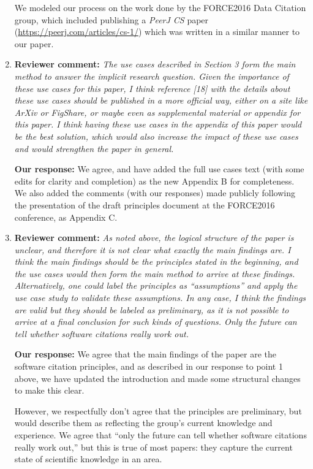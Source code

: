 \documentclass{article}
\begin{document}
\begin{enumerate}
We modeled our process on the work done by the FORCE2016 Data Citation group, which included publishing a \emph{PeerJ CS} paper (\url{https://peerj.com/articles/cs-1/}) which was written in a similar manner to our paper.

\item \textbf{Reviewer comment:}
\emph{The use cases described in Section 3 form the main method to answer the implicit research question. Given the importance of these use cases for this paper, I think reference [18] with the details about these use cases should be published in a more official way, either on a site like ArXiv or FigShare, or maybe even as supplemental material or appendix for this paper. I think having these use cases in the appendix of this paper would be the best solution, which would also increase the impact of these use cases and would strengthen the paper in general.}

\textbf{Our response:}
We agree, and have added the full use cases text (with some edits for clarity and completion) as the new Appendix B for completeness.
We also added the comments (with our responses) made publicly following the presentation of the draft principles document at the FORCE2016 conference, as Appendix C.


\item \textbf{Reviewer comment:}
\emph{As noted above, the logical structure of the paper is unclear, and therefore it is not clear what exactly the main findings are. I think the main findings should be the principles stated in the beginning, and the use cases would then form the main method to arrive at these findings. Alternatively, one could label the principles as ``assumptions'' and apply the use case study to validate these assumptions. In any case, I think the findings are valid but they should be labeled as preliminary, as it is not possible to arrive at a final conclusion for such kinds of questions. Only the future can tell whether software citations really work out.}

\textbf{Our response:}
We agree that the main findings of the paper are the software citation principles, and as described in our response to point 1 above, we have updated the introduction and made some structural changes to make this clear.

However, we respectfully don't agree that the principles are preliminary, but would describe them as reflecting the group's current knowledge and experience.  We agree that ``only the future can tell whether software citations really work out,'' but this is true of most papers: they capture the current state of scientific knowledge in an area.


\end{enumerate}
\end{document}

